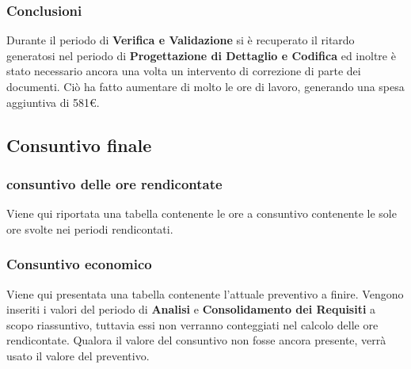 		\subsubsection{Conclusioni}
		Durante il periodo di \textbf{Verifica e Validazione} si è recuperato il ritardo generatosi nel periodo di \textbf{Progettazione di Dettaglio e Codifica} ed inoltre è stato necessario ancora una volta un intervento di correzione di parte dei documenti. Ciò ha fatto aumentare di molto le ore di lavoro, generando una spesa aggiuntiva di 581€.
	\subsection{Consuntivo finale}
	\subsubsection{consuntivo delle ore rendicontate}
	Viene qui riportata una tabella contenente le ore a consuntivo contenente le sole ore svolte nei periodi rendicontati.
	\begin{table}[H]
		\centering
		\caption{Distribuzione ore rendicontate}
	\end{table}
	\newpage
	\subsubsection{Consuntivo economico}
	Viene qui presentata una tabella contenente l'attuale preventivo a finire. Vengono inseriti i valori del periodo di \textbf{Analisi} e \textbf{Consolidamento dei Requisiti} a scopo riassuntivo, tuttavia essi non verranno conteggiati nel calcolo delle ore rendicontate. Qualora il valore del consuntivo non fosse ancora presente, verrà usato il valore del preventivo.\\
	
